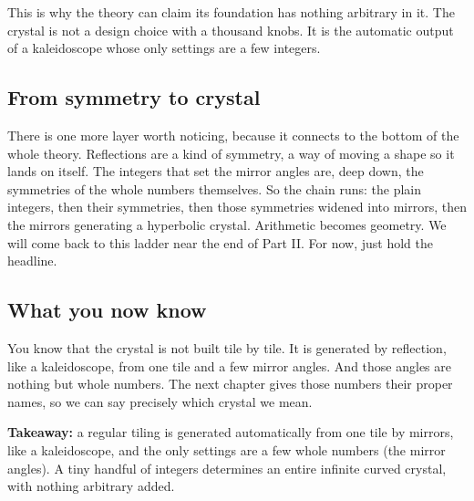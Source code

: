 This is why the theory can claim its foundation has nothing arbitrary in it. The crystal is not a design choice with a thousand knobs. It is the automatic output of a kaleidoscope whose only settings are a few integers.

\subsection{From symmetry to crystal}

There is one more layer worth noticing, because it connects to the bottom of the whole theory. Reflections are a kind of symmetry, a way of moving a shape so it lands on itself. The integers that set the mirror angles are, deep down, the symmetries of the whole numbers themselves. So the chain runs: the plain integers, then their symmetries, then those symmetries widened into mirrors, then the mirrors generating a hyperbolic crystal. Arithmetic becomes geometry. We will come back to this ladder near the end of Part II. For now, just hold the headline.

\subsection{What you now know}

You know that the crystal is not built tile by tile. It is generated by reflection, like a kaleidoscope, from one tile and a few mirror angles. And those angles are nothing but whole numbers. The next chapter gives those numbers their proper names, so we can say precisely which crystal we mean.

\textbf{Takeaway:} a regular tiling is generated automatically from one tile by mirrors, like a kaleidoscope, and the only settings are a few whole numbers (the mirror angles). A tiny handful of integers determines an entire infinite curved crystal, with nothing arbitrary added.
